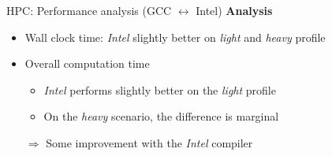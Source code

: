 \documentclass[shortpres,usenames,dvipsnames]{beamer}
\begin{document}
\begin{frame}{HPC: Performance analysis (GCC $\leftrightarrow$ Intel)}
	\textbf{Analysis}
	\begin{itemize}
		\item Wall clock time: \textit{Intel} slightly better on \textit{light} and \textit{heavy} profile
		\item Overall computation time
		\begin{itemize}
			\item \textit{Intel} performs slightly better on the \textit{light} profile
			\item On the \textit{heavy} scenario, the difference is marginal
		\end{itemize}
		\item[$\Rightarrow$] Some improvement with the \textit{Intel} compiler
	\end{itemize}
\end{frame}
\end{document}
